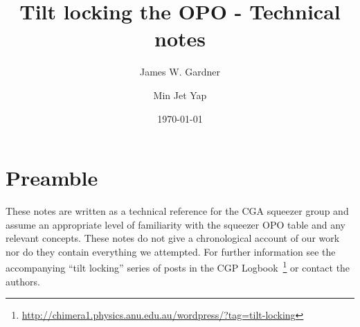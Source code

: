 \documentclass[aps,pra,superscriptaddress,reprint,nofootinbib]{revtex4-1}
\begin{document}
\title{Tilt locking the OPO - Technical notes}

\author{James W. Gardner}

\author{Min Jet Yap}



\date{\today}



\maketitle

\tableofcontents

\section{Preamble}
\label{sec:preamble}

These notes are written as a technical reference for the CGA squeezer group and assume an appropriate level of familiarity with the squeezer OPO table and any relevant concepts.
These notes do not give a chronological account of our work nor do they contain everything we attempted. For further information see the accompanying ``tilt locking'' series of posts in the CGP Logbook~\footnote{\url{http://chimera1.physics.anu.edu.au/wordpress/?tag=tilt-locking}} or contact the authors.
\end{document}
